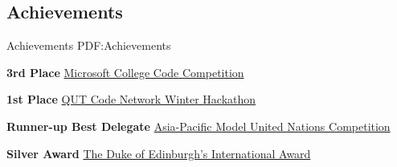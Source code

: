 \documentclass[a4paper,10pt,oneside]{article}
\begin{document}
\begin{body}


\section
{Achievements}
{Achievements}
{PDF:Achievements}







\textbf{3rd Place}
\href{https://msft3c.com/}{Microsoft College Code Competition}
\hfill {}
\EntryGap
\EntryGap

\textbf{1st Place}
\href{https://codenetwork.co/hackathon-2017/}{QUT Code Network Winter Hackathon}
\hfill {}
\EntryGap
\EntryGap

\textbf{Runner-up Best Delegate}
\href{http://www.amunc.net/}{Asia-Pacific Model United Nations Competition} 
\hfill {}
\EntryGap
\EntryGap

\textbf{Silver Award}
\href{http://www.dukeofed.com.au/}{The Duke of Edinburgh’s International Award}
\hfill {}
\EntryGap


\end{body}
\end{document}
